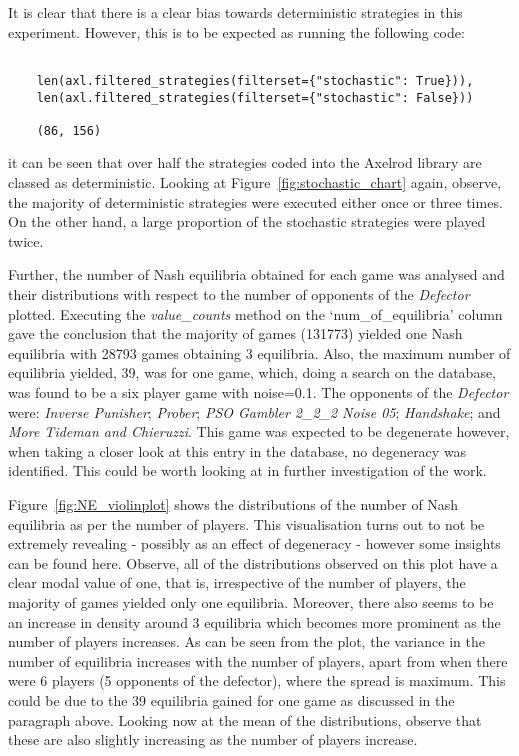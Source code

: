 It is clear that there is a clear bias towards deterministic strategies
in this experiment. However, this is to be expected as running the following
code:
\begin{verbatim}
    
    len(axl.filtered_strategies(filterset={"stochastic": True})), 
    len(axl.filtered_strategies(filterset={"stochastic": False}))

    (86, 156)
\end{verbatim}
it can be seen that over half the strategies coded into the Axelrod library are
classed as deterministic. Looking at Figure~\ref{fig:stochastic_chart} again,
observe, the majority of deterministic strategies were executed either once or
three times. On the other hand, a large proportion of the stochastic strategies
were played twice.

Further, the number of Nash equilibria obtained for each game was analysed and
their distributions with respect to the number of opponents of the
\textit{Defector} plotted. Executing the \textit{value\_counts} method on the
`num\_of\_equilibria' column gave the conclusion that the majority of games
(131773) yielded one Nash equilibria with 28793 games obtaining 3 equilibria.
Also, the maximum number of equilibria yielded, 39, was for one game, which,
doing a search on the database, was found to be a six player game with
noise=0.1. The opponents of the \textit{Defector} were: \textit{Inverse
Punisher}; \textit{Prober}; \textit{PSO Gambler 2\_2\_2 Noise 05};
\textit{Handshake}; and \textit{More Tideman and Chieruzzi}. This game was
expected to be degenerate however, when taking a closer look at this entry in
the database, no degeneracy was identified. This could be worth looking at in
further investigation of the work. 

Figure~\ref{fig:NE_violinplot} shows the distributions of the number of Nash
equilibria as per the number of players. This visualisation turns out to not be
extremely revealing - possibly as an effect of degeneracy - however some
insights can be found here. Observe, all of the distributions
observed on this plot have a clear modal value of one, that is, irrespective of
the number of players, the majority of games yielded only one equilibria.
Moreover, there also seems to be an increase in density around 3 equilibria
which becomes more prominent as the number of players increases. As can
be seen from the plot, the variance in the number of equilibria increases with
the number of players, apart from when there were 6 players (5 opponents of the
defector), where the spread is maximum. This could be due to the 39 equilibria
gained for one game as discussed in the paragraph above. Looking now at the mean
of the distributions, observe that these are also slightly increasing as the
number of players increase. 

